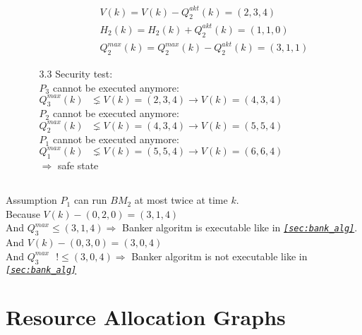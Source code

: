 \documentclass[a4paper, 11pt]{article}
\begin{document}
\begin{enumerate}
\begin{enumerate}
                \begin{align*}
                    &V(k) = V(k) - Q_2^{akt}(k) = (2,3,4) \\
                    &H_2(k) = H_2(k) +Q_2^{akt}(k) = (1,1,0) \\
                    &Q_2^{max}(k) = Q_2^{max}(k) - Q_2^{akt}(k) = (3,1,1) 
                \end{align*}
                \item[3.3] Security test: \\
                $P_3$ cannot be executed anymore:\\ $Q_3^{max}(k) \mbox{ } \lneq V(k) = (2,3,4) \rightarrow V(k) = (4,3,4)$ \\
                $P_2$ cannot be executed anymore: \\ $Q_2^{max}(k) \mbox{ } \lneq V(k) = (4,3,4) \rightarrow V(k) = (5,5,4)$ \\
                $P_1$ cannot be executed anymore: \\ $Q_1^{max}(k) \mbox{ } \lneq V(k) = (5,5,4) \rightarrow V(k) = (6,6,4)$ \\
                $\Rightarrow$ safe state
            \end{enumerate} 
        \end{enumerate}

        \subsection{}
        
        Assumption $P_1$ can run $BM_2$ at most twice at time $k$. \\
        Because $V(k) - (0,2,0) = (3,1,4)$ \\
        And $Q_3^{max} \leq (3,1,4) \Rightarrow$ Banker algoritm is executable like in \textit{\texttt{\autoref{sec:bank_alg}}}. \\
        And $V(k) - (0,3,0) = (3,0,4)$ \\
        And $Q_3^{max} \mbox{ } !\leq (3,0,4) \Rightarrow$ Banker algoritm is not executable like in \textit{\texttt{\autoref{sec:bank_alg}}}
        \newpage

        \section{Resource Allocation Graphs}
\end{document}
